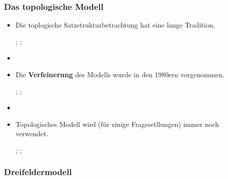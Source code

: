 \begin{frame}
\frametitle{Das topologische Modell}

\begin{itemize}
	\item Die toplogische Satzstrukturbetrachtung hat eine lange Tradition.
	
	\ras \citealt{Herling1821a-u}; \citealt{Erdmann1886a-Short}; \textbf{\citealt{Drach39a}}
	
	\item[]
	\item Die \textbf{Verfeinerung} des Modells wurde in den 1980ern vorgenommen. 
	
	\ras \citealt{Reis80a-link}; \citealt{Hoehle83a}; \citealt{Hoehle85a} \\
	\hfill \citep[vgl.][]{MRR2018a-ed}
	
	\item[]
	
	\item Topologisches Modell wird (für einige Fragesetllungen) immer noch verwendet.
	
	\ras \citealt{Ramers06a}; \citealt{Pafel09}; \citealt{Woellstein10a} 


\end{itemize}

\end{frame}


\subsubsection{Dreifeldermodell}



